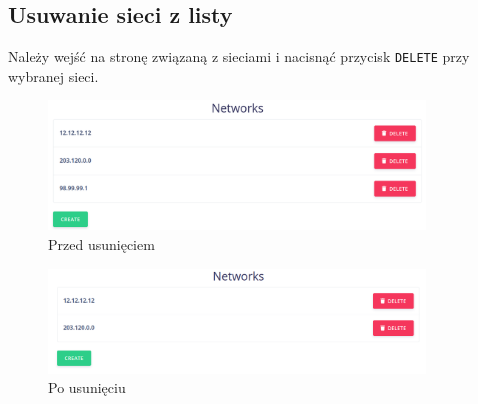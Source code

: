 \documentclass[a4paper,11pt]{article}
\begin{document}
\subsection{Usuwanie sieci z listy}
Należy wejść na stronę związaną z sieciami i nacisnąć przycisk \texttt{DELETE} przy wybranej sieci.
\begin{figure}[H]
	\centering
	\includegraphics[width=10cm]{instr03.png}
	\caption{Przed usunięciem}
\end{figure}

\begin{figure}[H]
	\centering
	\includegraphics[width=10cm]{instr01.png}
	\caption{Po usunięciu}
\end{figure}
\end{document}
